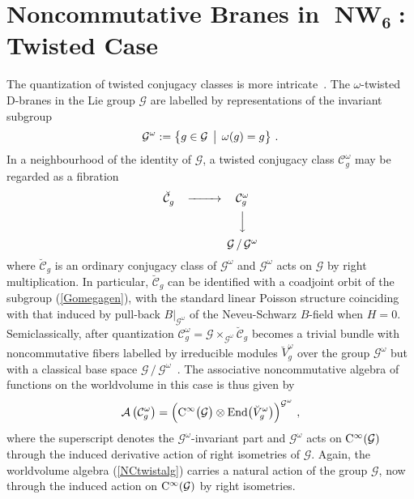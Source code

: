 \documentclass[11pt,a4paper]{article}
\DeclareMathOperator{\NW}{NW}
\newcommand{\mbf}[1]{{\boldsymbol {#1} }}
\newcommand{\newsection}{\setcounter{equation}{0}\section}
\newcommand{\beq}{\begin{eqnarray}}
\newcommand{\eeq}{\end{eqnarray}}
\begin{document}
\newsection{Noncommutative Branes in $\mbf{\NW_6}$: Twisted
  Case\label{TwistedNCBranes}}

The quantization of twisted conjugacy classes is more
intricate~\cite{AFQS1}. The $\omega$-twisted D-branes in the Lie group
$\mathcal{G}$ are labelled by representations of the invariant
subgroup
\beq
\mathcal{G}^\omega:=\bigl\{g\in\mathcal{G}\,\bigm|\,\omega(g)=g
\bigr\} \ .
\label{Gomegagen}\eeq
In a neighbourhood of the identity of $\mathcal G$, a twisted
conjugacy class $\mathcal{C}_g^\omega$ may be regarded as a fibration
\begin{equation}
  \label{conjfibre}
  \begin{CD}
    \breve{\mathcal C}^{~}_g ~~     @>>> \mathcal{C}_g^\omega\\
    @.    @VVV\\ @.
     \mathcal{G}\,/\,\mathcal{G}^\omega  \\
  \end{CD}
\end{equation}
where $\breve{\mathcal C}_g$ is an ordinary conjugacy class of
$\mathcal{G}^\omega$ and $\mathcal{G}^\omega$ acts on $\mathcal{G}$ by
right multiplication. In particular, $\breve{\mathcal C}_g$ can
be identified with a coadjoint orbit of the subgroup (\ref{Gomegagen}),
with the standard linear Poisson structure coinciding with that induced
by pull-back $B|_{\mathcal{G}^\omega}$ of the Neveu-Schwarz
$B$-field when $H=0$. Semiclassically, after quantization
$\mathcal{C}_g^\omega=\mathcal{G}\times_{\mathcal{G}^\omega}\breve{\mathcal
  C}^{~}_g$ becomes a trivial bundle with noncommutative fibers labelled by
irreducible modules $\breve{V}_g^\omega$ over the group
$\mathcal{G}^\omega$ but with a classical base space
$\mathcal{G}\,/\,\mathcal{G}^\omega$~\cite{AFQS1}. The associative
noncommutative algebra of functions on the worldvolume in this case is
thus given by
\beq
\mathcal{A}\left(\mathcal{C}_g^\omega\right)=\Bigl({\rm C}^\infty\bigl(
\mathcal{G}\bigr)\otimes{\rm End}\bigl(\breve{V}_g^\omega\bigr)
\Bigr)^{\mathcal{G}^\omega} \ ,
\label{NCtwistalg}\eeq
where the superscript denotes the $\mathcal{G}^\omega$-invariant
part and $\mathcal{G}^\omega$ acts on ${\rm C}^\infty(\mathcal{G})$
through the induced derivative action of right isometries of
$\mathcal{G}$. Again, the worldvolume algebra (\ref{NCtwistalg})
carries a natural action of the group $\mathcal{G}$, now
through the induced action on ${\rm C}^\infty(\mathcal{G})$ by right
isometries.
\end{document}
